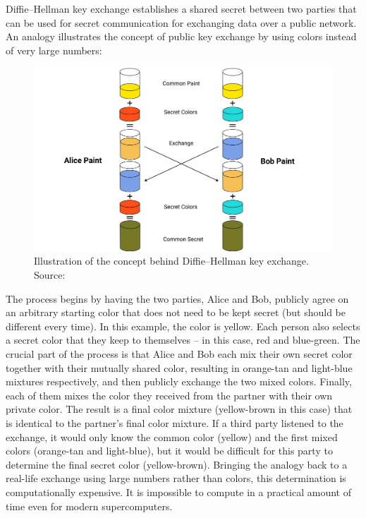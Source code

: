 Diffie–Hellman key exchange establishes a shared secret between two parties that can be used for secret communication
for exchanging data over a public network.
An analogy illustrates the concept of public key exchange by using colors instead of very large numbers:
\begin{figure}[H]
    \centering
    \includegraphics[width=1\textwidth]{Pictures/Diffie-Hellman}
    \caption{Illustration of the concept behind Diffie–Hellman key exchange. Source: }\label{fig:figure4}
\end{figure}
The process begins by having the two parties, Alice and Bob, publicly agree on an arbitrary starting color that does
not need to be kept secret (but should be different every time).
In this example, the color is yellow.
Each person also selects a secret color that they keep to themselves – in this case, red and blue-green.
The crucial part of the process is that Alice and Bob each mix their own secret color together with their mutually
shared color, resulting in orange-tan and light-blue mixtures respectively, and then publicly exchange the two mixed colors.
Finally, each of them mixes the color they received from the partner with their own private color.
The result is a final color mixture (yellow-brown in this case) that is identical to the partner's final color mixture.
If a third party listened to the exchange, it would only know the common color (yellow) and the first mixed colors
(orange-tan and light-blue), but it would be difficult for this party to determine the final secret color (yellow-brown).
Bringing the analogy back to a real-life exchange using large numbers rather than colors, this determination is
computationally expensive.
It is impossible to compute in a practical amount of time even for modern supercomputers.

